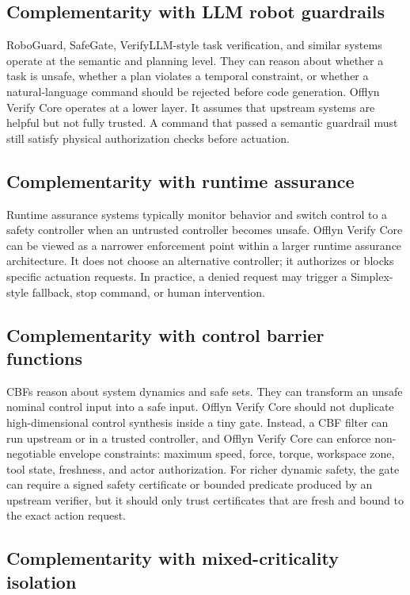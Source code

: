 \documentclass[10pt]{article}
\newcommand{\ovc}{Offlyn Verify Core\xspace}
\begin{document}
\subsection{Complementarity with LLM robot guardrails}

RoboGuard, SafeGate, VerifyLLM-style task verification, and similar systems operate at the semantic and planning level. They can reason about whether a task is unsafe, whether a plan violates a temporal constraint, or whether a natural-language command should be rejected before code generation. \ovc operates at a lower layer. It assumes that upstream systems are helpful but not fully trusted. A command that passed a semantic guardrail must still satisfy physical authorization checks before actuation.

\subsection{Complementarity with runtime assurance}

Runtime assurance systems typically monitor behavior and switch control to a safety controller when an untrusted controller becomes unsafe. \ovc can be viewed as a narrower enforcement point within a larger runtime assurance architecture. It does not choose an alternative controller; it authorizes or blocks specific actuation requests. In practice, a denied request may trigger a Simplex-style fallback, stop command, or human intervention.

\subsection{Complementarity with control barrier functions}

CBFs reason about system dynamics and safe sets. They can transform an unsafe nominal control input into a safe input. \ovc should not duplicate high-dimensional control synthesis inside a tiny gate. Instead, a CBF filter can run upstream or in a trusted controller, and \ovc can enforce non-negotiable envelope constraints: maximum speed, force, torque, workspace zone, tool state, freshness, and actor authorization. For richer dynamic safety, the gate can require a signed safety certificate or bounded predicate produced by an upstream verifier, but it should only trust certificates that are fresh and bound to the exact action request.

\subsection{Complementarity with mixed-criticality isolation}
\end{document}
